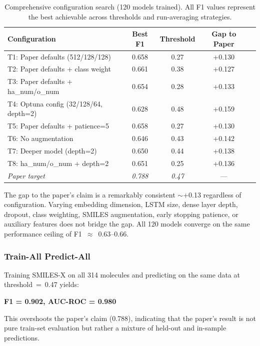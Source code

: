 \documentclass[11pt,a4paper]{article}
\begin{document}
\begin{table}[H]
\centering
\caption{Comprehensive configuration search (120 models trained). All F1 values represent the best achievable across thresholds and run-averaging strategies.}
\label{tab:configs}
\begin{tabular}{L{7.0cm}cccc}
\toprule
Configuration & Best F1 & Threshold & Gap to Paper \\
\midrule
T1: Paper defaults (512/128/128) & 0.658 & 0.27 & +0.130 \\
T2: Paper defaults + class weight & 0.661 & 0.38 & +0.127 \\
T3: Paper defaults + ha\_num/o\_num & 0.654 & 0.28 & +0.133 \\
T4: Optuna config (32/128/64, depth=2) & 0.628 & 0.48 & +0.159 \\
T5: Paper defaults + patience=5 & 0.658 & 0.27 & +0.130 \\
T6: No augmentation & 0.646 & 0.43 & +0.142 \\
T7: Deeper model (depth=2) & 0.650 & 0.44 & +0.138 \\
T8: ha\_num/o\_num + depth=2 & 0.651 & 0.25 & +0.136 \\
\midrule
{}
\textit{Paper target} & \textit{0.788} & \textit{0.47} & --- \\
\bottomrule
\end{tabular}
\end{table}

The gap to the paper's claim is a remarkably consistent $\sim$+0.13 regardless of configuration. Varying embedding dimension, LSTM size, dense layer depth, dropout, class weighting, SMILES augmentation, early stopping patience, or auxiliary features does not bridge the gap. All 120 models converge on the same performance ceiling of F1~$\approx$~0.63--0.66.

\subsubsection{Train-All Predict-All}

Training SMILES-X on all 314 molecules and predicting on the same data at threshold~=~0.47 yields:
\begin{center}
\textbf{F1 = 0.902, AUC-ROC = 0.980}
\end{center}
This overshoots the paper's claim (0.788), indicating that the paper's result is not pure train-set evaluation but rather a mixture of held-out and in-sample predictions.
\end{document}
